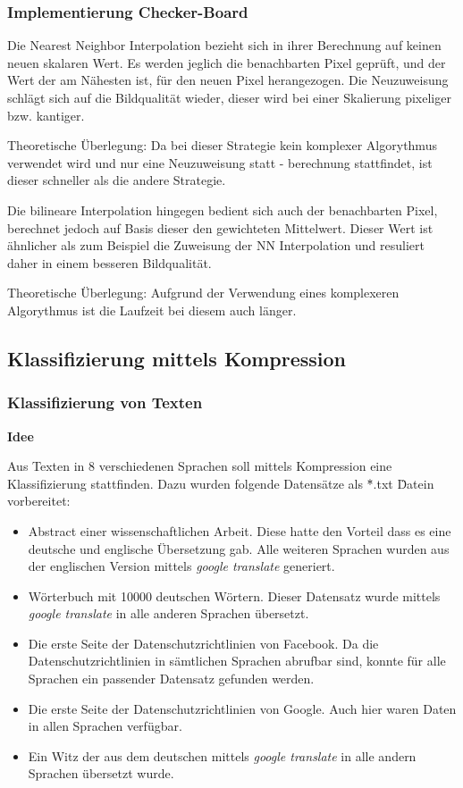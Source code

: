 \documentclass[12pt,german]{article}
\begin{document}



\subsubsection{Implementierung Checker-Board}

Die Nearest Neighbor Interpolation bezieht sich in ihrer Berechnung auf keinen neuen skalaren Wert. Es werden jeglich die benachbarten Pixel geprüft, und der Wert der am Nähesten ist, für den neuen Pixel herangezogen. Die Neuzuweisung schlägt sich auf die Bildqualität wieder, dieser wird bei einer Skalierung pixeliger bzw. kantiger.

Theoretische Überlegung: Da bei dieser Strategie kein komplexer Algorythmus verwendet wird und nur eine Neuzuweisung statt - berechnung stattfindet, ist dieser schneller als die andere Strategie.

Die bilineare Interpolation hingegen bedient sich auch der benachbarten Pixel, berechnet jedoch auf Basis dieser den gewichteten Mittelwert. Dieser Wert ist ähnlicher als zum Beispiel die Zuweisung der NN Interpolation und resuliert daher in einem besseren Bildqualität. 

Theoretische Überlegung: Aufgrund der Verwendung eines komplexeren Algorythmus ist die Laufzeit bei diesem auch länger.

 \subsection{Klassifizierung mittels Kompression}
\subsubsection{Klassifizierung von Texten}

\textbf{Idee}

Aus Texten in 8 verschiedenen Sprachen soll mittels Kompression eine Klassifizierung stattfinden. Dazu wurden folgende Datensätze als \" *.txt \" Datein vorbereitet:

\begin{itemize}
	\item Abstract einer wissenschaftlichen Arbeit. Diese hatte den Vorteil dass es eine deutsche und englische Übersetzung gab. Alle weiteren Sprachen wurden aus der englischen Version mittels \textit{google translate} generiert.
	\item Wörterbuch mit 10000 deutschen Wörtern. Dieser Datensatz wurde mittels \textit{google translate} in alle anderen Sprachen übersetzt.
	\item Die erste Seite der Datenschutzrichtlinien von Facebook. Da die Datenschutzrichtlinien in sämtlichen Sprachen abrufbar sind, konnte für alle Sprachen ein passender Datensatz gefunden werden.
	\item Die erste Seite der Datenschutzrichtlinien von Google. Auch hier waren Daten in allen Sprachen verfügbar.
	\item Ein Witz der aus dem deutschen mittels \textit{google translate} in alle andern Sprachen übersetzt wurde.
\end{itemize}
\end{document}

